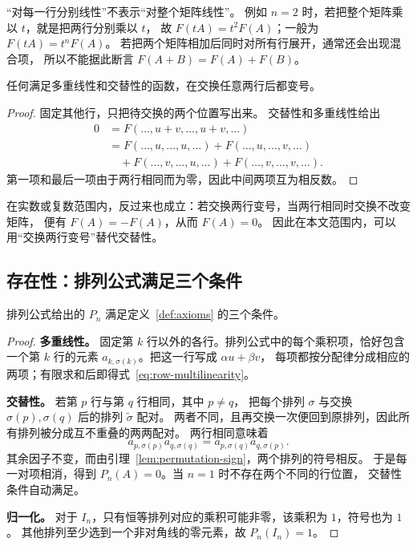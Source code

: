 \documentclass[UTF8,12pt,a4paper,fontset=fandol]{ctexart}
\begin{document}
“对每一行分别线性”不表示“对整个矩阵线性”。
例如 $n=2$ 时，若把整个矩阵乘以 $t$，就是把两行分别乘以 $t$，
故 $F(tA)=t^2F(A)$；一般为 $F(tA)=t^nF(A)$。
若把两个矩阵相加后同时对所有行展开，通常还会出现混合项，
所以不能据此断言 $F(A+B)=F(A)+F(B)$。

\begin{proposition}[交换两行变号]
\label{prop:row-swap}
任何满足多重线性和交替性的函数，在交换任意两行后都变号。
\end{proposition}

\begin{proof}
固定其他行，只把待交换的两个位置写出来。
交替性和多重线性给出
\begin{align*}
  0&=F(\ldots,u+v,\ldots,u+v,\ldots)\\
   &=F(\ldots,u,\ldots,u,\ldots)
    +F(\ldots,u,\ldots,v,\ldots)\\
   &\quad+F(\ldots,v,\ldots,u,\ldots)
    +F(\ldots,v,\ldots,v,\ldots).
\end{align*}
第一项和最后一项由于两行相同而为零，因此中间两项互为相反数。
\end{proof}

在实数或复数范围内，反过来也成立：若交换两行变号，当两行相同时交换不改变矩阵，
便有 $F(A)=-F(A)$，从而 $F(A)=0$。
因此在本文范围内，可以用“交换两行变号”替代交替性。

\subsection{存在性：排列公式满足三个条件}

\begin{theorem}[存在性]
\label{thm:axiomatic-existence}
排列公式给出的 $P_n$ 满足定义~\ref{def:axioms} 的三个条件。
\end{theorem}

\begin{proof}
\textbf{多重线性。}
固定第 $k$ 行以外的各行。排列公式中的每个乘积项，恰好包含一个第 $k$ 行的元素
$a_{k,\sigma(k)}$。把这一行写成 $\alpha u+\beta v$，
每项都按分配律分成相应的两项；有限求和后即得式~\eqref{eq:row-multilinearity}。

\textbf{交替性。}
若第 $p$ 行与第 $q$ 行相同，其中 $p\ne q$，
把每个排列 $\sigma$ 与交换 $\sigma(p),\sigma(q)$ 后的排列 $\widetilde\sigma$ 配对。
两者不同，且再交换一次便回到原排列，因此所有排列被分成互不重叠的两两配对。
两行相同意味着
\[
  a_{p,\sigma(p)}a_{q,\sigma(q)}
  =a_{p,\sigma(q)}a_{q,\sigma(p)}.
\]
其余因子不变，而由引理~\ref{lem:permutation-sign}，两个排列的符号相反。
于是每一对项相消，得到 $P_n(A)=0$。当 $n=1$ 时不存在两个不同的行位置，
交替性条件自动满足。

\textbf{归一化。}
对于 $I_n$，只有恒等排列对应的乘积可能非零，该乘积为 $1$，符号也为 $1$。
其他排列至少选到一个非对角线的零元素，故 $P_n(I_n)=1$。
\end{proof}
\end{document}
